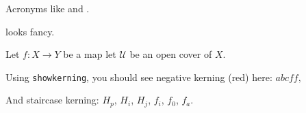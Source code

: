 \documentclass{scrartcl}
\begin{document}
Acronyms like  and .

 looks fancy.

Let $f\colon X\to Y$ be a map let $\mathcal{U}$ be an open cover of $X$.

Using \verb!showkerning!, you should see negative kerning (red) here: $abcff,$

And staircase kerning: $H_p$, $H_i$, $H_j$, $f_i$, $f_0$, $f_a$.
\end{document}
